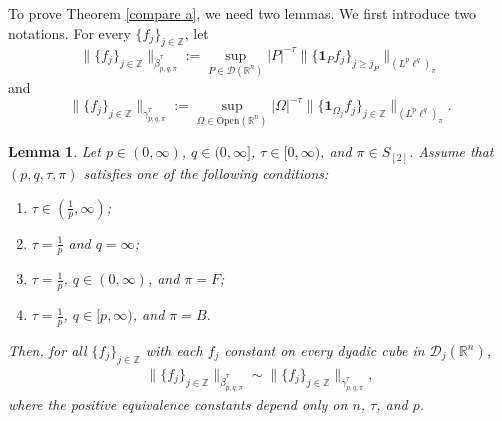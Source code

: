 \documentclass[11pt, reqno]{amsart}
\newtheorem{lemma}[theorem]{Lemma}
\theoremstyle{definition}
\theoremstyle{remark}
\numberwithin{equation}{section}
\newcommand{\R}{\mathbb R}
\newcommand{\Z}{\mathbb Z}
\newcommand{\one}{\mathbf{1}}
\newcommand{\Open}{\mathrm{Open}}
\begin{document}
To prove Theorem \ref{compare a}, we need two lemmas.
We first introduce two notations.
For every $\{f_j\}_{j\in\mathbb Z}$, let
$$
\|\{f_j\}_{j\in\mathbb Z}\|_{\dot\beta^\tau_{p,q,\pi}}
:=\sup_{P\in\mathscr D(\R^n)} |P|^{-\tau}
\Big\|\Big\{\one_{P} f_j\Big\}_{j\geq j_P}\Big\|_{(L^p\ell^q)_{\pi}}
$$
and
$$
\|\{f_j\}_{j\in\mathbb Z}\|_{\dot\gamma^\tau_{p,q,\pi}}
:=\sup_{\Omega\in\Open(\R^n)} |\Omega|^{-\tau}
\Big\|\Big\{\one_{\Omega_j}f_j\Big\}_{j\in\Z}\Big\|_{(L^p\ell^q)_{\pi}}.
$$

\begin{lemma} \label{equiv super}
Let $p\in(0,\infty)$, $q\in(0,\infty]$, $\tau\in[0,\infty)$,
and $\pi\in S_{[2]}$.
Assume that $(p,q,\tau,\pi)$ satisfies one of the following conditions:
\begin{enumerate}[\rm(i)]
\item $\tau\in(\frac1p,\infty)$;

\item $\tau=\frac1p$ and $q=\infty$;

\item $\tau=\frac1p$, $q\in(0,\infty)$, and $\pi=F$;

\item $\tau=\frac 1p$, $q\in[p,\infty)$, and $\pi=B$.
\end{enumerate}
Then, for all $\{f_j\}_{j\in\mathbb Z}$ with each $f_j$ constant on every dyadic cube in $\mathscr D_j(\R^n)$,
\begin{align*}
\|\{f_j\}_{j\in\mathbb Z}\|_{\dot\beta^\tau_{p,q,\pi}}
\sim \|\{f_j\}_{j\in\mathbb Z}\|_{\dot\gamma^\tau_{p,q,\pi}},
\end{align*}
where the positive equivalence constants depend only on $n$, $\tau$, and $p$.
\end{lemma}
\end{document}
